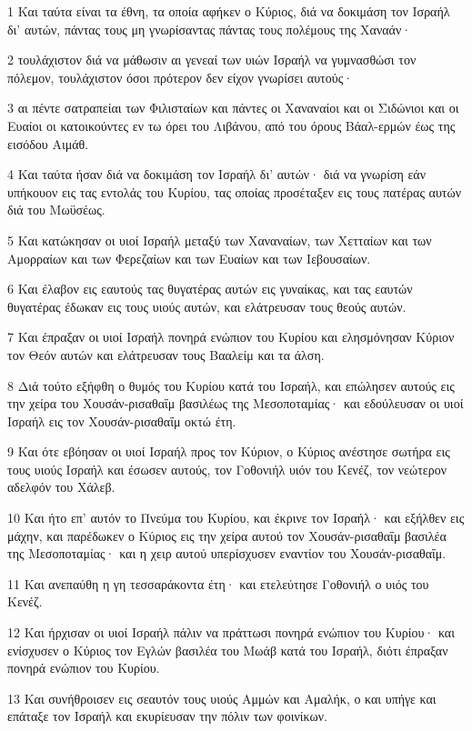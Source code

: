 \par 1 Και ταύτα είναι τα έθνη, τα οποία αφήκεν ο Κύριος, διά να δοκιμάση τον Ισραήλ δι' αυτών, πάντας τους μη γνωρίσαντας πάντας τους πολέμους της Χαναάν·
\par 2 τουλάχιστον διά να μάθωσιν αι γενεαί των υιών Ισραήλ να γυμνασθώσι τον πόλεμον, τουλάχιστον όσοι πρότερον δεν είχον γνωρίσει αυτούς·
\par 3 αι πέντε σατραπείαι των Φιλισταίων και πάντες οι Χαναναίοι και οι Σιδώνιοι και οι Ευαίοι οι κατοικούντες εν τω όρει του Λιβάνου, από του όρους Βάαλ-ερμών έως της εισόδου Αιμάθ.
\par 4 Και ταύτα ήσαν διά να δοκιμάση τον Ισραήλ δι' αυτών· διά να γνωρίση εάν υπήκουον εις τας εντολάς του Κυρίου, τας οποίας προσέταξεν εις τους πατέρας αυτών διά του Μωϋσέως.
\par 5 Και κατώκησαν οι υιοί Ισραήλ μεταξύ των Χαναναίων, των Χετταίων και των Αμορραίων και των Φερεζαίων και των Ευαίων και των Ιεβουσαίων.
\par 6 Και έλαβον εις εαυτούς τας θυγατέρας αυτών εις γυναίκας, και τας εαυτών θυγατέρας έδωκαν εις τους υιούς αυτών, και ελάτρευσαν τους θεούς αυτών.
\par 7 Και έπραξαν οι υιοί Ισραήλ πονηρά ενώπιον του Κυρίου και ελησμόνησαν Κύριον τον Θεόν αυτών και ελάτρευσαν τους Βααλείμ και τα άλση.
\par 8 Διά τούτο εξήφθη ο θυμός του Κυρίου κατά του Ισραήλ, και επώλησεν αυτούς εις την χείρα του Χουσάν-ρισαθαΐμ βασιλέως της Μεσοποταμίας· και εδούλευσαν οι υιοί Ισραήλ εις τον Χουσάν-ρισαθαΐμ οκτώ έτη.
\par 9 Και ότε εβόησαν οι υιοί Ισραήλ προς τον Κύριον, ο Κύριος ανέστησε σωτήρα εις τους υιούς Ισραήλ και έσωσεν αυτούς, τον Γοθονιήλ υιόν του Κενέζ, τον νεώτερον αδελφόν του Χάλεβ.
\par 10 Και ήτο επ' αυτόν το Πνεύμα του Κυρίου, και έκρινε τον Ισραήλ· και εξήλθεν εις μάχην, και παρέδωκεν ο Κύριος εις την χείρα αυτού τον Χουσάν-ρισαθαΐμ βασιλέα της Μεσοποταμίας· και η χειρ αυτού υπερίσχυσεν εναντίον του Χουσάν-ρισαθαΐμ.
\par 11 Και ανεπαύθη η γη τεσσαράκοντα έτη· και ετελεύτησε Γοθονιήλ ο υιός του Κενέζ.
\par 12 Και ήρχισαν οι υιοί Ισραήλ πάλιν να πράττωσι πονηρά ενώπιον του Κυρίου· και ενίσχυσεν ο Κύριος τον Εγλών βασιλέα του Μωάβ κατά του Ισραήλ, διότι έπραξαν πονηρά ενώπιον του Κυρίου.
\par 13 Και συνήθροισεν εις σεαυτόν τους υιούς Αμμών και Αμαλήκ, ο και υπήγε και επάταξε τον Ισραήλ και εκυρίευσαν την πόλιν των φοινίκων.
